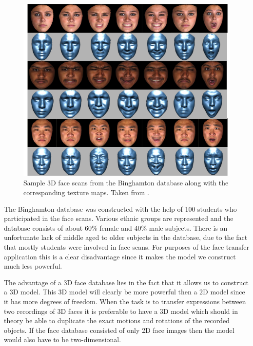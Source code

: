 \documentclass[11pt,a4paper,twoside]{report}
\begin{document}
\begin{figure}[H]
\begin{centering}
\includegraphics[scale=1]{images/binghamton.png}
\par\end{centering}

\caption{Sample 3D face scans from the Binghamton database along with the
  corresponding texture maps. Taken from \cite{binghamton}.}
\label{fg:binghamton}

\end{figure}

The Binghamton database was constructed with the help of 100 students who participated in the face
scans. Various ethnic groups are represented and the database consists of about
60\% female and 40\% male subjects. There is an unfortunate lack of middle aged to older
 subjects in the database, due to the fact that mostly students were
involved in face scans. For purposes of the face transfer application this is a clear
disadvantage since it makes the model we construct much less powerful.

The advantage of a 3D face database lies in the fact that it allows us to
construct a 3D model. This 3D model will clearly be more powerful then a 2D
model since it has more degrees of freedom. When the task is to transfer
expressions between two recordings of 3D faces it is preferable to have a 3D model
which should in theory be able to duplicate the exact motions and rotations of the recorded
objects. If the face database consisted of only 2D face images then the model
would also have to be two-dimensional.
\end{document}
